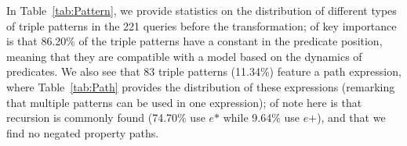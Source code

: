\documentclass[runningheads]{llncs}
\begin{document}
%
%

In Table~\ref{tab:Pattern}, we provide statistics on the distribution of different types of triple patterns in the 221 queries before the transformation; of key importance is that 86.20\% of the triple patterns have a constant in the predicate position, meaning that they are compatible with a model based on the dynamics of predicates. We also see that 83 triple patterns (11.34\%) feature a path expression, where Table~\ref{tab:Path} provides the distribution of these expressions (remarking that multiple patterns can be used in one expression); of note here is that recursion is commonly found (74.70\% use $e\texttt{*}$ while 9.64\% use $e\texttt{+}$), and that we find no negated property paths.
\end{document}
